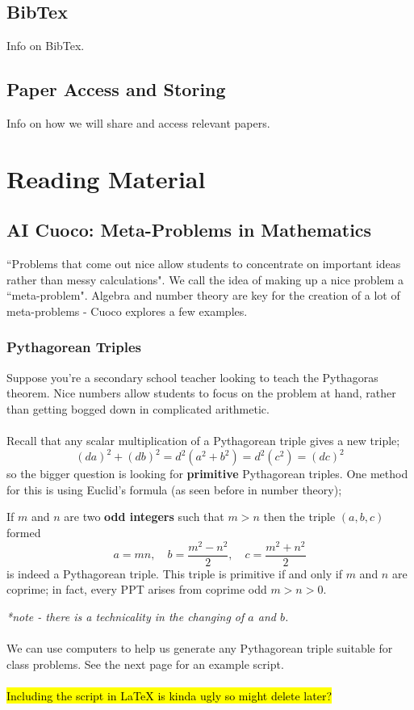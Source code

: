 \documentclass[12pt]{article}
\begin{document}
\subsection{BibTex}
Info on BibTex.

\subsection{Paper Access and Storing}
Info on how we will share and access relevant papers.

\pagebreak 

\section{Reading Material}

\subsection{AI Cuoco: Meta-Problems in Mathematics}
``Problems that come out nice allow students to concentrate on important ideas rather than messy calculations". We call the idea of making up a nice problem a ``meta-problem". Algebra and number theory are key for the creation of a lot of meta-problems - Cuoco explores a few examples.

\subsubsection{Pythagorean Triples}
Suppose you're a secondary school teacher looking to teach the Pythagoras theorem. Nice numbers allow students to focus on the problem at hand, rather than getting bogged down in complicated arithmetic.\\\\
Recall that any scalar multiplication of a Pythagorean triple gives a new triple;
\begin{equation*}
    (da)^2 + (db)^2 = d^2(a^2 + b^2) = d^2(c^2) = (dc)^2
\end{equation*}
so the bigger question is looking for \textbf{primitive} Pythagorean triples. One method for this is using Euclid's formula (as seen before in number theory);
\begin{thm}{}{}
If $m$ and $n$ are two \textbf{odd integers} such that $m > n$ then the triple $(a, b, c)$ formed
\begin{equation*}
    a = mn,\quad b = \frac{m^2 - n^2}{2},\quad c = \frac{m^2 + n^2}{2}
\end{equation*}
is indeed a Pythagorean triple. This triple is primitive if and only if $m$ and $n$ are coprime; in fact, every PPT arises from coprime odd $m > n > 0$.
\end{thm}
\textit{*note - there is a technicality in the changing of $a$ and $b$.}\\\\
We can use computers to help us generate any Pythagorean triple suitable for class problems. See the next page for an example script.\\\\
\hl{Including the script in \LaTeX{} is kinda ugly so might delete later?}
\end{document}

